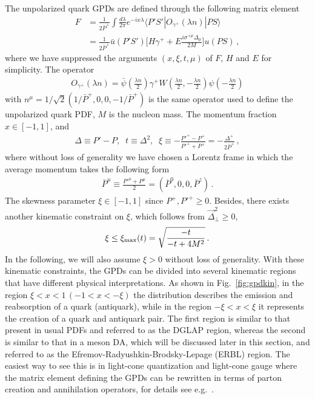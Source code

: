 \documentclass[aps,rmp,reprint,amsmath,amssymb,graphicx,longbibliography]{revtex4-1} %
\newcommand{\beq}{\begin{eqnarray}}
\newcommand{\eeq}{\end{eqnarray}}
\newcommand{\nn}{\nonumber}
\DeclareRobustCommand{\fig}[1]{Fig.~\ref{fig:#1}}
\begin{document}
The unpolarized quark GPDs are defined through the following matrix element~\cite{Ji:2004gf}
\begin{align}\label{eq:GPD}
	F&=\frac{1}{2{\bar P}^+}\int \frac{d\lambda}{2\pi}e^{-i x\lambda}\langle P'S'|O_{\gamma^+}(\lambda n)|PS\rangle\nn\\
	&=\frac{1}{2{\bar P}^+}\bar{u}(P'S')\bigg[H\gamma^+
	+E\frac{i\sigma^{+\mu}\Delta_\mu}{2M}\bigg]u(PS)\,,
\end{align}
where we have suppressed the arguments $(x,\xi,t, \mu)$ of $F$, $H$ and $E$ for simplicity. The operator
\begin{align}
	O_{\gamma^+}(\lambda n)=\bar\psi(\frac{\lambda n} 2)\gamma^+ W(\frac{\lambda n}{2},-\frac{\lambda n}{2})\psi(-\frac{\lambda n} 2)
\end{align}
with $n^\mu=1/\sqrt 2(1/{\bar P}^+, 0,0, -1/{\bar P}^+)$ is the same operator used to define the unpolarized quark PDF, $M$ is the nucleon mass.
%
The momentum fraction $x\in [-1,1]$, and
\begin{align}\label{eq:kinematic_variable}
	\Delta\equiv P'-P,\;\; t\equiv \Delta^2,\;\; \xi\equiv -\frac{P'^+-P^+}{P'^++P^+}=-\frac{\Delta^+}{2{\bar P}^+}\,,
\end{align}
where without loss of generality we have chosen a Lorentz frame in which the average momentum takes the following form
\begin{align}
	{\bar P}^\mu\equiv\frac{P'^\mu+P^\mu}{2}=({\bar P}^0,0,0,{\bar P}^z)\,.
\end{align}
The skewness parameter $\xi\in[-1,1]$ since $P^+, P'^+\ge0$. Besides, there exists another kinematic constraint on $\xi$, which follows from $\vec \Delta^2_\perp\ge 0$,
\beq\label{eq:sklimit}
\xi\le\xi_{\rm max}(t)=\sqrt{\frac{-t}{-t+4M^2}}\,.
\eeq
In the following, we will also assume $\xi>0$ without loss of generality. With these kinematic constraints, the GPDs can be divided into several kinematic regions that have different physical interpretations. As shown in \fig{gpdkin}, in the region $\xi<x<1\, (-1<x<-\xi)$ the distribution describes the emission and reabsorption of a quark (antiquark), while in the region $-\xi<x<\xi$ it represents the creation of a quark and antiquark pair. The first region is similar to that present in usual PDFs and referred to as the DGLAP region, whereas the second is similar to that in a meson DA, which will be discussed later in this section, and referred to as the Efremov-Radyushkin-Brodsky-Lepage (ERBL) region. The easiest way to see this is in light-cone quantization and light-cone gauge where the matrix element defining the GPDs can be rewritten in terms of parton creation and annihilation operators, for details see e.g.~\cite{Ji:2004gf}.
\end{document}
